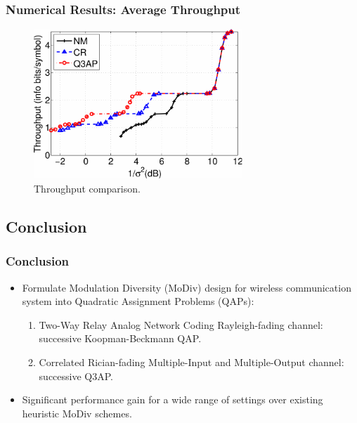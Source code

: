 \documentclass{beamer}
\begin{document}
\begin{frame}
  \frametitle{Numerical Results: Average Throughput}
  \begin{figure}
    \includegraphics[width=0.7\textwidth]{figs/throughput_5M_64QAM_Q3AP.pdf}
    \caption{Throughput comparison.}
  \end{figure}
\end{frame}

\subsection{Conclusion}
\begin{frame}
  \frametitle{Conclusion}
  \begin{itemize}[<+->]
    \item Formulate Modulation Diversity (MoDiv) design for wireless
    communication system into Quadratic Assignment Problems (QAPs):
    \begin{enumerate}
      \item Two-Way Relay Analog Network Coding Rayleigh-fading channel:
      successive Koopman-Beckmann QAP.
      \item Correlated Rician-fading Multiple-Input and Multiple-Output channel:
      successive Q3AP.
    \end{enumerate}
    \item Significant performance gain for a wide range of settings over
    existing heuristic MoDiv schemes. 
  \end{itemize}
\end{frame}

\end{document}
